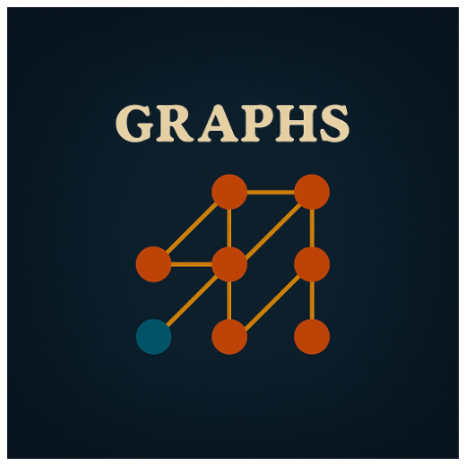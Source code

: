 \documentclass[a4paper,10pt]{book}
\begin{document}
\vspace{50mm}

\begin{center}
\includegraphics[height=13.88cm, width=17cm, keepaspectratio]{Pics/graph.png}
\end{center}
\end{document}
